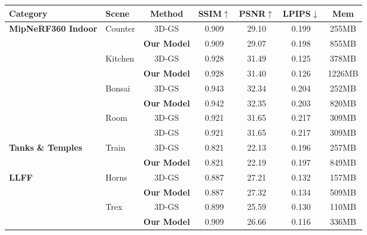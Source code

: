
    \begin{tabular}{llccccc}
    \toprule
    \textbf{Category} & \textbf{Scene} & \textbf{Method} & \textbf{SSIM$\uparrow$} & \textbf{PSNR$\uparrow$} & \textbf{LPIPS$\downarrow$} & \textbf{Mem} \\
    \midrule
    \multirow{8}{*}{\textbf{MipNeRF360 Indoor}} & 
        \multirow{2}{*}{Counter} 
        & 3D-GS & 0.909 & 29.10 & 0.199 & 255MB \\
            & & \textbf{Our Model} & 0.909 & 29.07 & 0.198 & 855MB \\
            \cmidrule{2-7} &
        \multirow{2}{*}{Kitchen} 
        & 3D-GS & 0.928 & 31.49 & 0.125 & 378MB \\
            & & \textbf{Our Model} & 0.928 & 31.40 & 0.126 & 1226MB \\
            \cmidrule{2-7} &
        \multirow{2}{*}{Bonsai} 
        & 3D-GS & 0.943 & 32.34 & 0.204 & 252MB \\
            & & \textbf{Our Model} & 0.942 & 32.35 & 0.203 & 820MB \\
            \cmidrule{2-7} &
        \multirow{2}{*}{Room} 
        & 3D-GS & 0.921 & 31.65 & 0.217 & 309MB \\
            & & 3D-GS & 0.921 & 31.65 & 0.217 & 309MB \\
        \midrule
    \multirow{2}{*}{\textbf{Tanks \& Temples}} & 
        \multirow{2}{*}{Train} 
        & 3D-GS & 0.821 & 22.13 & 0.196 & 257MB \\
            & & \textbf{Our Model} & 0.821 & 22.19 & 0.197 & 849MB \\
        \midrule
    \multirow{4}{*}{\textbf{LLFF}} & 
        \multirow{2}{*}{Horns} 
        & 3D-GS & 0.887 & 27.21 & 0.132 & 157MB \\
            & & \textbf{Our Model} & 0.887 & 27.32 & 0.134 & 509MB \\
            \cmidrule{2-7} &
        \multirow{2}{*}{Trex} 
        & 3D-GS & 0.899 & 25.59 & 0.130 & 110MB \\
            & & \textbf{Our Model} & 0.909 & 26.66 & 0.116 & 336MB \\
    \bottomrule
    \end{tabular}